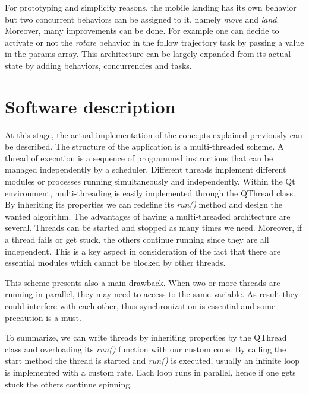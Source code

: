 For prototyping and simplicity reasons, the mobile landing has its own behavior but two concurrent behaviors can be assigned to it, namely \textit{move} and \textit{land}. Moreover, many improvements can be done. For example one can decide to activate or not the \textit{rotate} behavior in the follow trajectory task by passing a value in the params array. This architecture can be largely expanded from its actual state by adding behaviors, concurrencies and tasks.



\section{Software description}
\label{sec:sofdescrip}
At this stage, the actual implementation of the concepts explained previously can be described. The structure of the application is a multi-threaded scheme. A thread of execution is a sequence of programmed instructions that can be managed independently by a scheduler. Different threads implement different modules or processes running simultaneously and independently. Within the Qt environment, multi-threading is easily implemented through the QThread class. By inheriting its properties we can redefine its \textit{run()} method and design the wanted algorithm. The advantages of having a multi-threaded architecture are several. Threads can be started and stopped as many times we need. Moreover, if a thread fails or get stuck, the others continue running since they are all independent. This is a key aspect in consideration of the fact that there are essential modules which cannot be blocked by other threads. 

This scheme presents also a main drawback. When two or more threads are running in parallel, they may need to access to the same variable. As result they could interfere with each other, thus synchronization is essential and some precaution is a must. 

To summarize, we can write threads by inheriting properties by the QThread class and overloading its \textit{run()} function with our custom code. By calling the start method the thread is started and \textit{run()} is executed, usually an infinite loop is implemented with a custom rate. Each loop runs in parallel, hence if one gets stuck the others continue spinning. 


